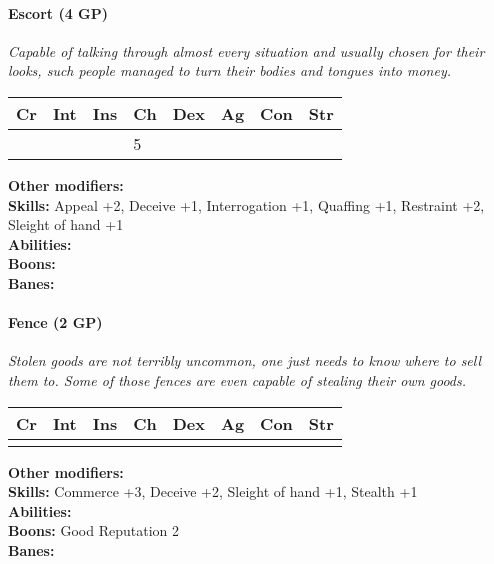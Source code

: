 \paragraph*{Escort (4 GP)}
\textit{Capable of talking through almost every situation and usually chosen for their looks, such people managed to turn their bodies and tongues into money.}\par
\begin{tabular}{|l|l|l|l|l|l|l|l|}
	\hline
	Cr & Int & Ins & Ch & Dex & Ag & Con & Str \\ \hline
	&  &  & 5 &  &  &  &  \\ \hline
\end{tabular}\par
\noindent\textbf{Other modifiers:} \\
\textbf{Skills:} Appeal +2,
Deceive +1,
Interrogation +1,
Quaffing +1,
Restraint +2,
Sleight of hand +1\\
\textbf{Abilities:} \\
\textbf{Boons:} \\
\textbf{Banes:} \\

\hrulefill
\paragraph*{Fence (2 GP)}
\textit{Stolen goods are not terribly uncommon, one just needs to know where to sell them to. Some of those fences are even capable of stealing their own goods.}\par
\begin{tabular}{|l|l|l|l|l|l|l|l|}
	\hline
	Cr & Int & Ins & Ch & Dex & Ag & Con & Str \\ \hline
	&  &  &  &  &  &  &  \\ \hline
\end{tabular}\par
\noindent\textbf{Other modifiers:} \\
\textbf{Skills:} Commerce +3,
Deceive +2,
Sleight of hand +1,
Stealth +1\\
\textbf{Abilities:} \\
\textbf{Boons:} Good Reputation 2\\
\textbf{Banes:} \\

\hrulefill
